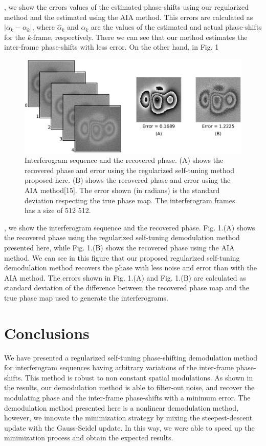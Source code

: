 , we show the errors values of the estimated phase-shifts using our
regularized method and the estimated using the AIA method. This errors
are calculated as $|\alpha_{k} - \alpha_{k}|$,
where $\hat{\alpha}_{k}$ and $\alpha_{k}$ are the values of the
estimated and actual phase-shifts for the \emph{k}-frame, respectively.
There we can see that our method estimates the inter-frame phase-shifts
with less error. On the other hand, in Fig. 1
\begin{figure}
\begin{centering}
\includegraphics[scale=0.2]{Chpt2_figures/Steps.eps}
\par\end{centering}

\caption{Interferogram sequence and the recovered phase. (A) shows the recovered
phase and error using the regularized self-tuning method proposed
here. (B) shows the recovered phase and error using the AIA method{[}15{]}.
The error shown (in radians) is the standard deviation respecting
the true phase map. The interferogram frames has a size of 512 \texttimes{}
512. }
\end{figure}
, we show the interferogram sequence and the recovered phase. Fig.
1.(A) shows the recovered phase using the regularized self-tuning
demodulation method presented here, while Fig. 1.(B) shows the recovered
phase using the AIA method. We can see in this figure that our proposed
regularized self-tuning demodulation method recovers the phase with
less noise and error than with the AIA method. The errors shown in
Fig. 1.(A) and Fig. 1.(B) are calculated as standard deviation of
the difference between the recovered phase map and the true phase
map used to generate the interferograms.


\section{Conclusions}

We have presented a regularized self-tuning phase-shifting demodulation
method for interferogram sequences having arbitrary variations of
the inter-frame phase-shifts. This method is robust to non constant
spatial modulations. As shown in the results, our demodulation method
is able to filter-out noise, and recover the modulating phase and
the inter-frame phase-shifts with a minimum error. The demodulation
method presented here is a nonlinear demodulation method, however,
we innovate the minimization strategy by mixing the steepest-descent
update with the Gauss-Seidel update. In this way, we were able to
speed up the minimization process and obtain the expected results.


